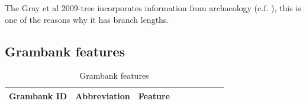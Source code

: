 \documentclass[draft,10pt]{article} %
\begin{document}
The Gray et al 2009-tree incorporates information from archaeology (c.f. \citet[92]{lynchrosscrowleyinternalsubgroupingoceanic}), this is one of the reasons why it has branch lengths.

\newpage
\subsection{Grambank features}
\label{Grambank_features}

\singlespacing
\begin{landscape}
\begin{longtable}{| l | p{4cm}| p{12cm}|p{2cm}|p{2cm}|p{2cm}|p{2cm}|p{2cm}|p{2cm}|}

\caption{{Grambank features}} \label{Grambank_features_table} \\
\hline
\textbf{Grambank ID} & \textbf{Abbreviation} & \textbf{Feature}\\ \hline
\endfirsthead


\end{longtable}
\end{landscape}
\end{document}
